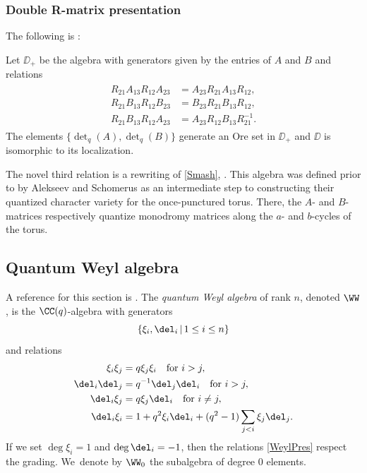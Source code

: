 \subsubsection{Double R-matrix presentation}
The following is \cite[Prop.\,1.8.3(b)]{VarVassRoot}:

\begin{prop}\label{DoublePres}
Let $\DD_+$ be the algebra with generators given by the entries of $A$ and $B$ and relations
\begin{align}
\begin{split}
R_{21}A_{13}R_{12}A_{23}&=A_{23}R_{21}A_{13}R_{12},\\
R_{21}B_{13}R_{12}B_{23}&=B_{23}R_{21}B_{13}R_{12},\\
R_{21}B_{13}R_{12}A_{23}&=A_{23}R_{12}B_{13}R_{21}^{-1}.
\end{split}
\label{ABPres}
\end{align}
The elements $\{\det_q(A),\det_q(B)\}$ generate an Ore set in $\DD_+$ and $\DD$ is isomorphic to its localization.
\end{prop}

The novel third relation is a rewriting of \eqref{Smash}, \cf \cite[A.5]{VarVassRoot}.
This algebra was defined prior to \cite{VarVassRoot} by Alekseev and Schomerus \cite{AlekScho} as an intermediate step to constructing their quantized character variety for the once-punctured torus.
There, the $A$- and $B$-matrices respectively quantize monodromy matrices along the $a$- and $b$-cycles of the torus.

\subsection{Quantum Weyl algebra}\label{QWeyl}
A reference for this section is \cite{GiaZhaQW}.
The \textit{quantum Weyl algebra} of rank $n$, denoted $\WW$, is the $\CC(q)$-algebra with generators
\[
\left\{ \xi_i, \del_i\,|\, 1\le i\le n\right\}
\]
and relations
\begin{align}
\begin{split}
\xi_i\xi_j&= q\xi_j\xi_i\quad\text{for }i>j,\\
\del_i\del_j&=q^{-1}\del_j\del_i\quad\text{for }i>j,\\
\del_i\xi_j&=q\xi_j\del_i\quad\text{for }i\not=j,\\
\del_i\xi_i&=1+q^2\xi_i\del_i+(q^2-1)\sum_{j<i}\xi_j\del_j.
\end{split}\label{WeylPres}
\end{align}
If we set $\deg \xi_i=1$ and $\deg\del_i=-1$, then the relations \eqref{WeylPres} respect the grading. We~denote by $\WW_0$ the subalgebra of degree 0 elements.

